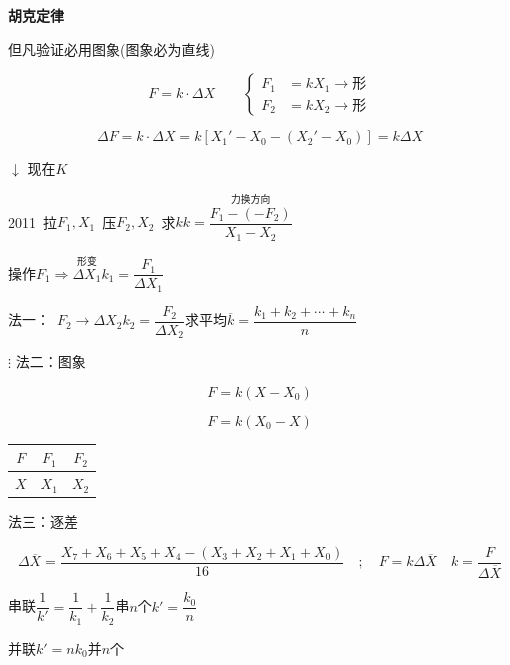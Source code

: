 \textbf{胡克定律}

但凡验证必用图象(图象必为直线)

\[
F=k\cdot\Delta X\qquad
\left\{
\begin{aligned}
F_1&=kX_1\to\text{形}\\
F_2&=kX_2\to\text{形}
\end{aligned}
\right.
\]

\[
\Delta F=k\cdot\Delta X=k\left[X_1'-X_0-(X_2'-X_0)\right]=k\Delta X
\]

$\downarrow$ 现在$K$ %

2011\ 拉$F_1,X_1$\ 压$F_2,X_2$\ 求$k$\qquad $k=\dfrac{\overset{\text{力换方向}}{F_1-(-F_2)}}{X_1-X_2}$

操作\quad $F_1\Rightarrow\overset{\text{形变}}{\Delta X_1}$\qquad $k_1=\dfrac{F_1}{\Delta X_1}$

法一：\ $F_2\to\Delta X_2$\qquad $k_2=\dfrac{F_2}{\Delta X_2}$\qquad 求平均$\overline{k}=\dfrac{k_1+k_2+\cdots+k_n}{n}$

$\vdots$
法二：图象
\begin{keybox}
\[F=k(X-X_0)\]
\end{keybox}


\begin{keybox}
\[F=k(X_0-X)\]
\end{keybox}


\begin{center}
\begin{tabular}{c|c|c|}
$F$ & $F_1$ & $F_2$ \\
\hline
$X$ & $X_1$ & $X_2$ \\
\end{tabular}
\end{center}
法三：逐差

\[
\Delta\overline{X}=\frac{X_7+X_6+X_5+X_4-(X_3+X_2+X_1+X_0)}{16}\quad;\quad F=k\Delta\overline{X}\quad k=\frac{F}{\Delta\overline{X}}
\]
\begin{keybox}
串联\quad $\dfrac{1}{k'}=\dfrac{1}{k_1}+\dfrac{1}{k_2}$\qquad 串$n$个\quad $k'=\dfrac{k_0}{n}$

并联\quad $k'=nk_0$\quad 并$n$个
\end{keybox}
